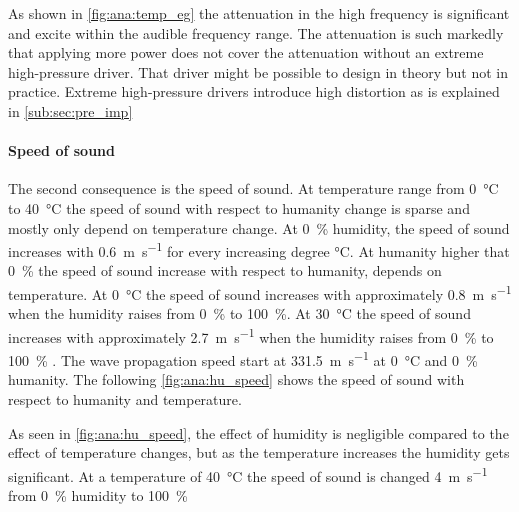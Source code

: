 

As shown in \autoref{fig:ana:temp_eg} the attenuation in the high frequency is significant and excite  within the audible frequency range. The attenuation is such markedly that applying more power does not cover the attenuation without an extreme high-pressure driver. That driver might be possible to design in theory but not in practice. Extreme high-pressure drivers introduce high distortion as is explained in \autoref{sub:sec:pre_imp}
 
\paragraph{Speed of sound} The second consequence is the speed of sound. At temperature range from \SI{0}{\celsius} to \SI{40}{\celsius} the speed of sound with respect to humanity change is sparse and mostly only depend on temperature change. At \SI{0}{\percent} humidity, the speed of sound increases with \SI{0.6}{\meter\per\second} for every increasing degree \si{\celsius}. At humanity higher that \SI{0}{\percent} the speed of sound increase with respect to humanity, depends on temperature. At \SI{0}{\celsius} the speed of sound increases with approximately \SI{0.8}{\meter\per\second} when the humidity raises from \SI{0}{\percent} to \SI{100}{\percent}. At \SI{30}{\celsius} the speed of sound increases with approximately \SI{2.7}{\meter\per\second} when the humidity raises from \SI{0}{\percent} to \SI{100}{\percent} \citep{humanity_effect_on_speed} \citep{bohn1987environmental}.  The wave propagation speed start at \SI{331.5}{\meter\per\second} at \SI{0}{\celsius} and \SI{0}{\percent} humanity. The following \autoref{fig:ana:hu_speed} shows the speed of sound with respect to humanity and temperature. 


As seen in \autoref{fig:ana:hu_speed}, the effect of humidity is negligible compared to the effect of temperature changes, but as the temperature increases the humidity gets significant. At a temperature of \SI{40}{\celsius} the speed of sound is changed \SI{4}{\meter\per\second} from \SI{0}{\percent} humidity to \SI{100}{\percent}


